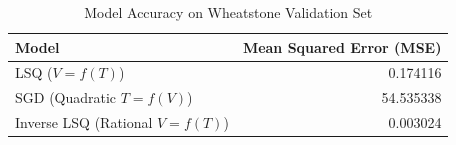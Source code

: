 \begin{table}[H]
\centering
\caption{Model Accuracy on Wheatstone Validation Set}
\label{table:wheatstone_validation_accuracy_table}
\begin{tabular}{lr}
\toprule
 Model & Mean Squared Error (MSE) \\
\midrule
 LSQ ($V=f(T)$) & 0.174116 \\
 SGD (Quadratic $T=f(V)$) & 54.535338 \\
 Inverse LSQ (Rational $V=f(T)$) & 0.003024 \\
\bottomrule
\end{tabular}
\end{table}

